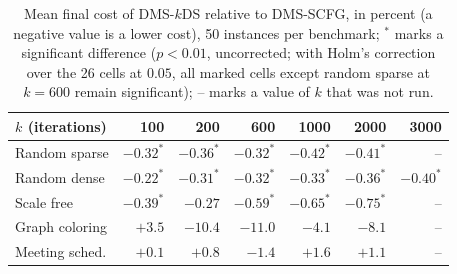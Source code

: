 \begin{table}[t]
\centering
\small
\caption{Mean final cost of DMS-$k$DS relative to DMS-SCFG, in percent (a negative value is a lower cost), 50 instances per benchmark; $^{*}$ marks a significant difference ($p < 0.01$, uncorrected; with Holm's correction over the 26 cells at $0.05$, all marked cells except random sparse at $k = 600$ remain significant); -- marks a value of $k$ that was not run.}
\label{Tab:delay}
\begin{tabular}{lrrrrrr}
$k$ (iterations) & 100 & 200 & 600 & 1000 & 2000 & 3000 \\ \hline
Random sparse & $-0.32^{*}$ & $-0.36^{*}$ & $-0.32^{*}$ & $-0.42^{*}$ & $-0.41^{*}$ & -- \\
Random dense & $-0.22^{*}$ & $-0.31^{*}$ & $-0.32^{*}$ & $-0.33^{*}$ & $-0.36^{*}$ & $-0.40^{*}$ \\
Scale free & $-0.39^{*}$ & $-0.27$ & $-0.59^{*}$ & $-0.65^{*}$ & $-0.75^{*}$ & -- \\
Graph coloring & $+3.5$ & $-10.4$ & $-11.0$ & $-4.1$ & $-8.1$ & -- \\
Meeting sched. & $+0.1$ & $+0.8$ & $-1.4$ & $+1.6$ & $+1.1$ & -- \\
\end{tabular}
\end{table}
